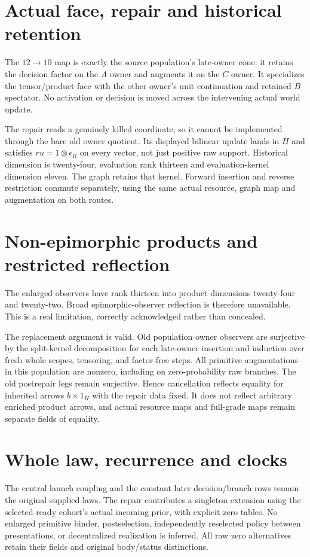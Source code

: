 \documentclass{article}
\begin{document}
\section*{Actual face, repair and historical retention}
The $12\to10$ map is exactly the source population's late-owner cone: it retains the decision factor on the $A$ owner and augments it on the $C$ owner. It specializes the tensor/product face with the other owner's unit continuation and retained $B$ spectator. No activation or decision is moved across the intervening actual world update.

The repair reads a genuinely killed coordinate, so it cannot be implemented through the bare old owner quotient. Its displayed bilinear update lands in $H$ and satisfies $ru=1\otimes\epsilon_R$ on every vector, not just positive raw support. Historical dimension is twenty-four, evaluation rank thirteen and evaluation-kernel dimension eleven. The graph retains that kernel. Forward insertion and reverse restriction commute separately, using the same actual resource, graph map and augmentation on both routes.

\section*{Non-epimorphic products and restricted reflection}
The enlarged observers have rank thirteen into product dimensions twenty-four and twenty-two. Broad epimorphic-observer reflection is therefore unavailable. This is a real limitation, correctly acknowledged rather than concealed.

The replacement argument is valid. Old population owner observers are surjective by the split-kernel decomposition for each late-owner insertion and induction over fresh whole scopes, tensoring, and factor-free steps. All primitive augmentations in this population are nonzero, including on zero-probability raw branches. The old postrepair legs remain surjective. Hence cancellation reflects equality for inherited arrows $b\times1_H$ with the repair data fixed. It does not reflect arbitrary enriched product arrows, and actual resource maps and full-grade maps remain separate fields of equality.

\section*{Whole law, recurrence and clocks}
The central launch coupling and the constant later decision/branch rows remain the original supplied laws. The repair contributes a singleton extension using the selected ready cohort's actual incoming prior, with explicit zero tables. No enlarged primitive binder, postselection, independently reselected policy between presentations, or decentralized realization is inferred. All raw zero alternatives retain their fields and original body/status distinctions.
\end{document}
